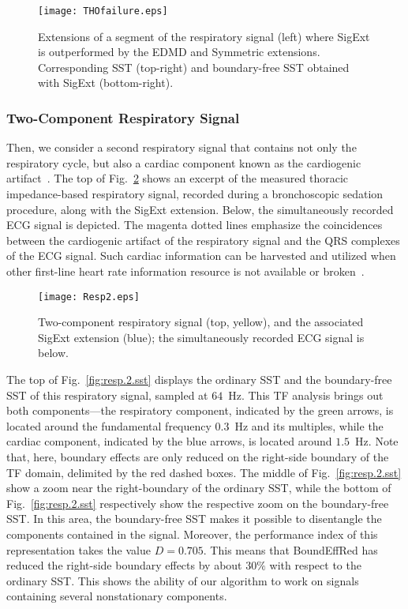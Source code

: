 \begin{figure}
\centering
\texttt{[image: THOfailure.eps]}
\caption{Extensions of a segment of the respiratory signal (left) where {\sf SigExt} is outperformed by the EDMD and Symmetric extensions. Corresponding SST (top-right) and boundary-free SST obtained with {\sf SigExt} (bottom-right).}
\label{fig:THO.failure}
\end{figure}

{\color{red}
\subsubsection{Two-Component Respiratory Signal}
Then, we consider a second respiratory signal that contains not only the respiratory cycle, but also a cardiac component known as the cardiogenic artifact~\cite{Smith94recognition}. The top of Fig.~\ref{fig:resp.2} shows an excerpt of the measured thoracic impedance-based respiratory signal, recorded during a bronchoscopic sedation procedure, along with the {\sf SigExt} extension. Below, the simultaneously recorded ECG signal is depicted. The magenta dotted lines emphasize the coincidences between the cardiogenic artifact of the respiratory signal and the QRS complexes of the ECG signal. Such cardiac information can be harvested and utilized when other first-line heart rate information resource is not available or broken~\cite{Lu19recycling}.

\begin{figure}
\centering
\texttt{[image: Resp2.eps]}
\caption{Two-component respiratory signal (top, yellow), and the associated {\sf SigExt} extension (blue); the simultaneously recorded ECG signal is below.}
\label{fig:resp.2}
\end{figure}

The top of Fig.~\ref{fig:resp.2.sst} displays the ordinary SST and the boundary-free SST of this respiratory signal, sampled at $64$~Hz. This TF analysis brings out both components---the respiratory component, indicated by the green arrows, is located around the fundamental frequency $0.3$~Hz and its multiples, while the cardiac component, indicated by the blue arrows, is located around $1.5$~Hz. Note that, here, boundary effects are only reduced on the right-side boundary of the TF domain, delimited by the red dashed boxes. The middle of Fig.~\ref{fig:resp.2.sst} show a zoom near the right-boundary of the ordinary SST, while the bottom of Fig.~\ref{fig:resp.2.sst} respectively show the respective zoom on the boundary-free SST. In this area, the boundary-free SST makes it possible to disentangle the components contained in the signal. Moreover, the performance index of this representation takes the value $D=0.705$. This means that {\sf BoundEffRed} has reduced the right-side boundary effects by about $30\%$ with respect to the ordinary SST. This shows the ability of our algorithm to work on signals containing several nonstationary components.

}
